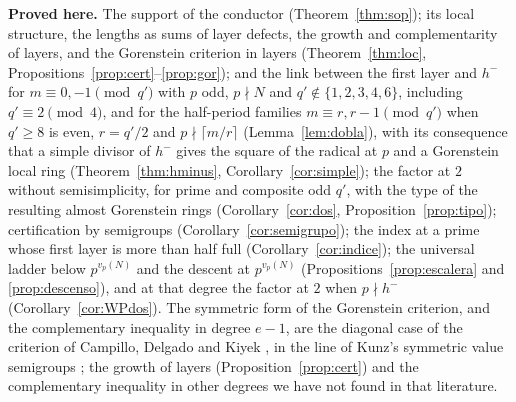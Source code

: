 \documentclass[11pt,a4paper]{article}
\theoremstyle{definition}
\begin{document}
\noindent\textbf{Proved here.} The support of the conductor (Theorem~\ref{thm:sop}); its local structure, the lengths
as sums of layer defects, the growth and complementarity of layers, and the Gorenstein criterion in layers
(Theorem~\ref{thm:loc}, Propositions~\ref{prop:cert}--\ref{prop:gor}); and the link between the first layer and $h^-$
for $m\equiv0,-1\pmod{q'}$ with $p$ odd, $p\nmid N$ and $q'\notin\{1,2,3,4,6\}$, including $q'\equiv2\pmod4$, and for
the half-period families $m\equiv r,r-1\pmod{q'}$ when $q'\ge8$ is even, $r=q'/2$ and $p\nmid\lceil m/r\rceil$ (Lemma~\ref{lem:dobla}), with its
consequence that a simple divisor of $h^-$ gives the square of the radical at $p$ and a Gorenstein local ring
(Theorem~\ref{thm:hminus}, Corollary~\ref{cor:simple}); the factor at $2$ without semisimplicity, for prime and composite odd $q'$, with the
type of the resulting almost Gorenstein rings (Corollary~\ref{cor:dos}, Proposition~\ref{prop:tipo}); certification
by semigroups (Corollary~\ref{cor:semigrupo}); the index at a prime whose first layer is more than half full
(Corollary~\ref{cor:indice}); the universal ladder below $p^{v_p(N)}$ and the descent at $p^{v_p(N)}$
(Propositions~\ref{prop:escalera} and \ref{prop:descenso}), and at that degree the factor at $2$ when $p\nmid h^-$
(Corollary~\ref{cor:WPdos}). The symmetric form of the Gorenstein criterion, and the complementary inequality in
degree $e-1$, are the diagonal case of the criterion of Campillo, Delgado and Kiyek \cite{CDK94}, in the line of
Kunz's symmetric value semigroups \cite{Kun70,Del87}; the growth of layers (Proposition~\ref{prop:cert}) and the
complementary inequality in other degrees we have not found in that literature.
\end{document}
